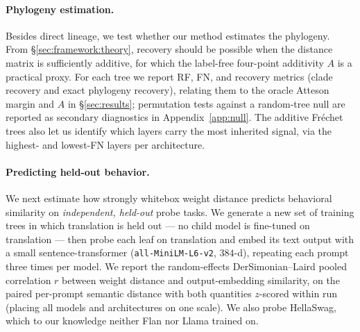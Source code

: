 \documentclass{article}
\theoremstyle{definition}
\theoremstyle{plain}
\begin{document}
\paragraph{Phylogeny estimation.}
\label{sec:exp:weights}
Besides direct lineage, we test whether our method estimates the phylogeny. From \S\ref{sec:framework:theory}, recovery should be possible when the distance matrix is sufficiently additive, for which the label-free four-point additivity $A$ is a practical proxy. For each tree we report RF, FN, and recovery metrics (clade recovery and exact phylogeny recovery), relating them to the oracle Atteson margin and $A$ in \S\ref{sec:results}; permutation tests against a random-tree null are reported as secondary diagnostics in Appendix~\ref{app:null}. The additive Fr\'echet trees also let us identify which layers carry the most inherited signal, via the highest- and lowest-FN layers per architecture.


\paragraph{Predicting held-out behavior.}
\label{sec:exp:behavioral}
We next estimate how strongly whitebox weight distance predicts behavioral similarity on \textit{independent, held-out} probe tasks. We generate a new set of training trees in which translation is held out --- no child model is fine-tuned on translation --- then probe each leaf on translation and embed its text output with a small sentence-transformer (\texttt{all-MiniLM-L6-v2}, $384$-d), repeating each prompt three times per model. We report the random-effects DerSimonian--Laird \citep{dersimonianlaird1986} pooled correlation $r$ between weight distance and output-embedding similarity, on the paired per-prompt semantic distance with both quantities $z$-scored within run (placing all models and architectures on one scale). We also probe HellaSwag, which to our knowledge neither Flan nor Llama trained on.

\end{document}
